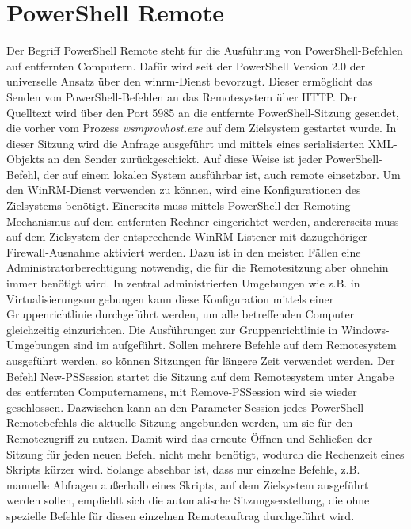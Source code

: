 \section{PowerShell Remote}\label{PowerShellRemote}
Der Begriff PowerShell Remote steht für die Ausführung von PowerShell-Befehlen auf entfernten Computern. Dafür wird seit der PowerShell Version 2.0 der universelle Ansatz über den \acrfull{winrm}-Dienst bevorzugt. Dieser ermöglicht das Senden von PowerShell-Befehlen an das Remotesystem über HTTP. Der Quelltext wird über den Port 5985 an die entfernte PowerShell-Sitzung gesendet, die vorher vom Prozess \textit{wsmprovhost.exe} auf dem Zielsystem gestartet wurde. In dieser Sitzung wird die Anfrage ausgeführt und mittels eines serialisierten XML-Objekts an den Sender zurückgeschickt. Auf diese Weise ist jeder PowerShell-Befehl, der auf einem lokalen System ausführbar ist, auch remote einsetzbar. Um den WinRM-Dienst verwenden zu können, wird eine Konfigurationen des Zielsystems benötigt. Einerseits muss mittels PowerShell der Remoting Mechanismus auf dem entfernten Rechner eingerichtet werden, andererseits muss auf dem Zielsystem der entsprechende WinRM-Listener mit dazugehöriger Firewall-Ausnahme aktiviert werden. Dazu ist in den meisten Fällen eine Administratorberechtigung notwendig, die für die Remotesitzung aber ohnehin immer benötigt wird. In zentral administrierten Umgebungen wie z.B. in Virtualisierungsumgebungen kann diese Konfiguration mittels einer Gruppenrichtlinie durchgeführt werden, um alle betreffenden Computer gleichzeitig einzurichten. Die Ausführungen zur Gruppenrichtlinie in Windows-Umgebungen sind im  aufgeführt. Sollen mehrere Befehle auf dem Remotesystem ausgeführt werden, so können Sitzungen für längere Zeit verwendet werden. Der Befehl New-PSSession startet die Sitzung auf dem Remotesystem unter Angabe des entfernten Computernamens, mit Remove-PSSession wird sie wieder geschlossen. Dazwischen kann an den Parameter Session jedes PowerShell Remotebefehls die aktuelle Sitzung angebunden werden, um sie für den Remotezugriff zu nutzen. Damit wird das erneute Öffnen und Schließen der Sitzung für jeden neuen Befehl nicht mehr benötigt, wodurch die Rechenzeit eines Skripts kürzer wird. Solange absehbar ist, dass nur einzelne Befehle, z.B. manuelle Abfragen außerhalb eines Skripts, auf dem Zielsystem ausgeführt werden sollen, empfiehlt sich die automatische Sitzungserstellung, die ohne spezielle Befehle für diesen einzelnen Remoteauftrag durchgeführt wird.
\cite[S.~862]{Weltner2013}

